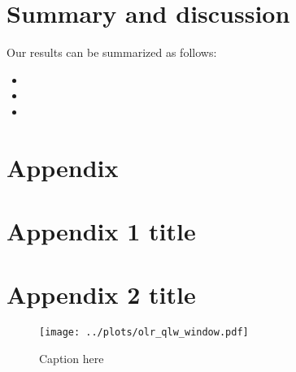 \documentclass[10pt]{article}
\begin{document}
\section{Summary and discussion}
Our results can be summarized as follows:
\begin{itemize}
	\item 
	\item
	\item
\end{itemize}



\section*{Appendix}
\appendix


	\section{Appendix 1 title}	 \label{appendix_1}	


	\section{Appendix 2 title} \label{appendix_2}
	
	
\pagebreak

\begin{figure}[h]
	\begin{center}
			\texttt{[image: ../plots/olr\_qlw\_window.pdf]}
		\caption{Caption here
		\label{fig_olr_qlw_window}
		}
	\end{center}
\end{figure}







%
\end{document}
